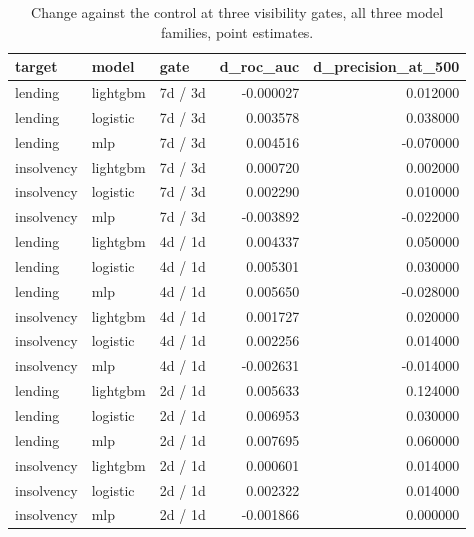 \begin{table}
\caption{Change against the control at three visibility gates, all three model families, point estimates.}
\label{tab:19_gate_ladder_all_families}
\begin{tabular}{lllrr}
\toprule
target & model & gate & d_roc_auc & d_precision_at_500 \\
\midrule
lending & lightgbm & 7d / 3d & -0.000027 & 0.012000 \\
lending & logistic & 7d / 3d & 0.003578 & 0.038000 \\
lending & mlp & 7d / 3d & 0.004516 & -0.070000 \\
insolvency & lightgbm & 7d / 3d & 0.000720 & 0.002000 \\
insolvency & logistic & 7d / 3d & 0.002290 & 0.010000 \\
insolvency & mlp & 7d / 3d & -0.003892 & -0.022000 \\
lending & lightgbm & 4d / 1d & 0.004337 & 0.050000 \\
lending & logistic & 4d / 1d & 0.005301 & 0.030000 \\
lending & mlp & 4d / 1d & 0.005650 & -0.028000 \\
insolvency & lightgbm & 4d / 1d & 0.001727 & 0.020000 \\
insolvency & logistic & 4d / 1d & 0.002256 & 0.014000 \\
insolvency & mlp & 4d / 1d & -0.002631 & -0.014000 \\
lending & lightgbm & 2d / 1d & 0.005633 & 0.124000 \\
lending & logistic & 2d / 1d & 0.006953 & 0.030000 \\
lending & mlp & 2d / 1d & 0.007695 & 0.060000 \\
insolvency & lightgbm & 2d / 1d & 0.000601 & 0.014000 \\
insolvency & logistic & 2d / 1d & 0.002322 & 0.014000 \\
insolvency & mlp & 2d / 1d & -0.001866 & 0.000000 \\
\bottomrule
\end{tabular}
\end{table}
